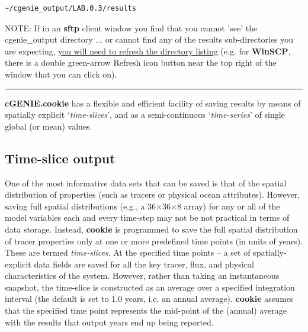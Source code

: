\vspace{-1mm}\small\begin{verbatim}
~/cgenie_output/LAB.0.3/results
\end{verbatim}\normalsize\vspace{-1mm}

\noindent NOTE: If in an \textbf{sftp} client window you find that you cannot 'see' the \textsf{\footnotesize cgenie\_output} directory ... or cannot find any of the results sub-directories you are expecting, \uline{you will need to refresh the directory listing} (e.g. for \textbf{WinSCP}, there is a double green-arrow \textsf{\footnotesize Refresh} icon button near the top right of the window that you can click on).

\vspace{1mm}\noindent\rule{4cm}{0.5pt}\vspace{2mm}

\noindent \textbf{cGENIE.cookie} has a flexible and efficient facility of saving results by means of spatially explicit ‘\textit{time-slices}’, and as a semi-continuous ‘\textit{time-series}’ of single global (or mean) values.


\subsection{Time-slice output}

One of the most informative data sets that can be saved is that of the spatial distribution of properties (such as tracers or physical ocean attributes). However, saving full spatial distributions (e.g., a 36\(\times\)36\(\times\)8 array) for any or all of the model variables each and every time-step may not be not practical in terms of data storage. Instead, \textbf{cookie} is programmed to save the full spatial distribution of tracer properties only at one or more predefined time points (in units of years). These are termed \textit{time-slices}. At the specified time points -- a set of spatially-explicit data fields are saved for all the key tracer, flux, and physical characteristics of the system. However, rather than taking an instantaneous snapshot, the time-slice is constructed as an average over a specified integration interval (the default is set to 1.0 years, i.e. an annual average). \textbf{cookie}  assumes that the specified time point represents the mid-point of the (annual) average with the results that output years end up being reported.

